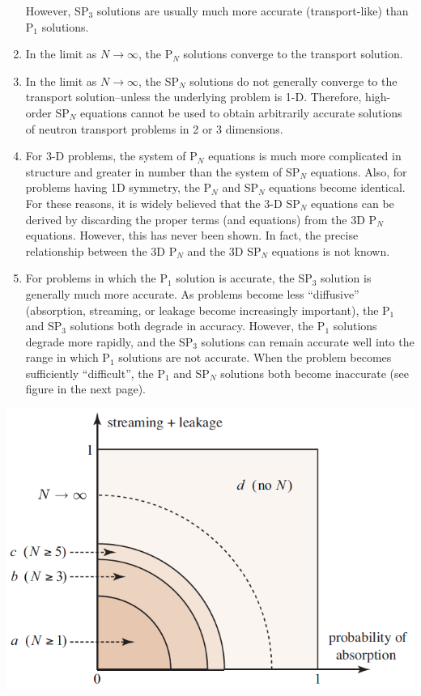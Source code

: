 \documentclass[12pt]{article}
\begin{document}
\begin{enumerate}
However, SP$_3$ solutions are usually much more accurate (transport-like) than P$_1$ solutions.
\item In the limit as $N\rightarrow\infty$, the P$_N$ solutions converge to the transport solution.
\item In the limit as $N\rightarrow\infty$, the SP$_N$ solutions do not generally converge to the transport solution--unless the underlying problem is 1-D.
Therefore, high-order SP$_N$ equations cannot be used to obtain arbitrarily accurate solutions of neutron transport problems in 2 or 3 dimensions.
\item For 3-D problems, the system of P$_N$ equations is much more complicated in structure and greater in number than the system of SP$_N$ equations.
Also, for problems having 1D symmetry, the P$_N$ and SP$_N$ equations become identical.
For these reasons, it is widely believed that the 3-D SP$_N$ equations can be derived by discarding the proper terms (and equations) from the 3D P$_N$ equations. However, this has never been shown.
In fact, the precise relationship between the 3D P$_N$ and the 3D SP$_N$ equations is not known.
\item For problems in which the P$_1$ solution is accurate, the SP$_3$ solution is generally much more accurate.
As problems become less ``diffusive'' (absorption, streaming, or leakage become increasingly important), the P$_1$ and SP$_3$ solutions both degrade in accuracy.
However, the P$_1$ solutions degrade more rapidly, and the SP$_3$ solutions can
remain accurate well into the range in which P$_1$ solutions are not accurate.
When the problem becomes sufficiently ``difficult'', the P$_1$ and SP$_N$ solutions both become inaccurate (see figure in the next page).
\end{enumerate}

\newpage

\begin{center}
\includegraphics[scale=0.7]{fig_spn}
\end{center}
\end{document}
